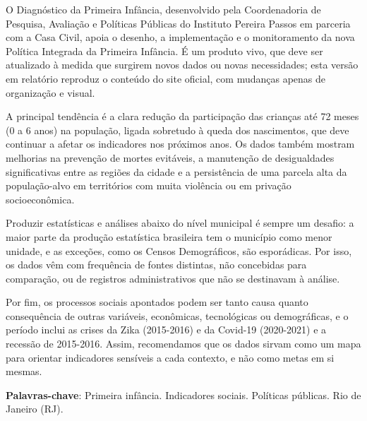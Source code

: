 \setlength{\absparsep}{12pt}
\begin{resumo}
O Diagnóstico da Primeira Infância, desenvolvido pela Coordenadoria de Pesquisa, Avaliação e Políticas Públicas do Instituto Pereira Passos em parceria com a Casa Civil, apoia o desenho, a implementação e o monitoramento da nova Política Integrada da Primeira Infância. É um produto vivo, que deve ser atualizado à medida que surgirem novos dados ou novas necessidades; esta versão em relatório reproduz o conteúdo do site oficial, com mudanças apenas de organização e visual.

A principal tendência é a clara redução da participação das crianças até 72 meses (0 a 6 anos) na população, ligada sobretudo à queda dos nascimentos, que deve continuar a afetar os indicadores nos próximos anos. Os dados também mostram melhorias na prevenção de mortes evitáveis, a manutenção de desigualdades significativas entre as regiões da cidade e a persistência de uma parcela alta da população-alvo em territórios com muita violência ou em privação socioeconômica.

Produzir estatísticas e análises abaixo do nível municipal é sempre um desafio: a maior parte da produção estatística brasileira tem o município como menor unidade, e as exceções, como os Censos Demográficos, são esporádicas. Por isso, os dados vêm com frequência de fontes distintas, não concebidas para comparação, ou de registros administrativos que não se destinavam à análise.

Por fim, os processos sociais apontados podem ser tanto causa quanto consequência de outras variáveis, econômicas, tecnológicas ou demográficas, e o período inclui as crises da Zika (2015-2016) e da Covid-19 (2020-2021) e a recessão de 2015-2016. Assim, recomendamos que os dados sirvam como um mapa para orientar indicadores sensíveis a cada contexto, e não como metas em si mesmas.

\noindent\textbf{Palavras-chave}: Primeira infância. Indicadores sociais. Políticas públicas. Rio de Janeiro (RJ).
\end{resumo}
